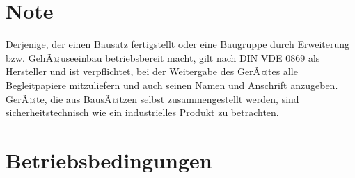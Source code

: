 \documentclass[fleqn,10pt]{SelfArx} %
\begin{document}
\flushbottom %

\maketitle %

\tableofcontents %

\thispagestyle{empty} %


\section*{Note} %


Derjenige, der einen Bausatz fertigstellt oder eine Baugruppe durch Erweiterung bzw. GehÃ¤useeinbau betriebsbereit macht, gilt nach DIN VDE 0869 als Hersteller und ist verpflichtet, bei der Weitergabe des GerÃ¤tes alle Begleitpapiere mitzuliefern und auch seinen Namen und Anschrift anzugeben. GerÃ¤te, die aus BausÃ¤tzen selbst zusammengestellt werden, sind sicherheitstechnisch wie ein industrielles Produkt zu betrachten.


\section{Betriebsbedingungen}
\end{document}
